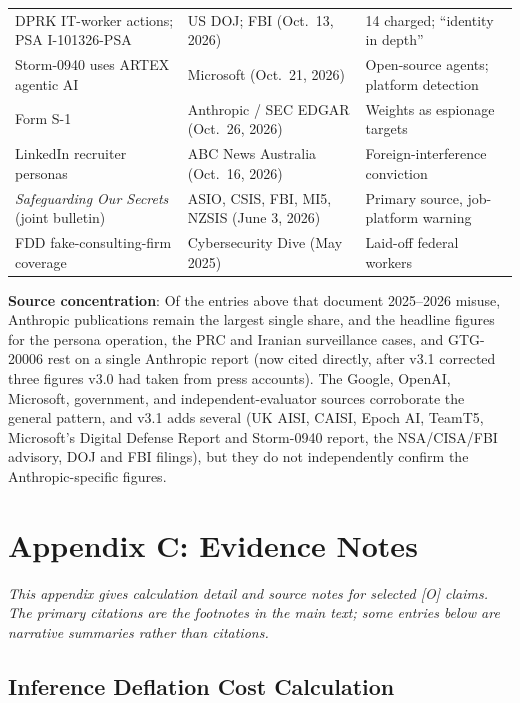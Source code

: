 \documentclass[11pt,letterpaper]{article}
\begin{document}
{\begin{longtable}{L{6.4cm}L{4.4cm}L{5.2cm}}
DPRK IT-worker actions; PSA I-101326-PSA & US DOJ; FBI (Oct.\ 13, 2026) & 14 charged; ``identity in depth'' \\
Storm-0940 uses ARTEX agentic AI & Microsoft (Oct.\ 21, 2026) & Open-source agents; platform detection \\
Form S-1 & Anthropic / SEC EDGAR (Oct.\ 26, 2026) & Weights as espionage targets \\
LinkedIn recruiter personas & ABC News Australia (Oct.\ 16, 2026) & Foreign-interference conviction \\
\textit{Safeguarding Our Secrets} (joint bulletin) & ASIO, CSIS, FBI, MI5, NZSIS (June 3, 2026) & Primary source, job-platform warning \\
FDD fake-consulting-firm coverage & Cybersecurity Dive (May 2025) & Laid-off federal workers \\
\bottomrule
\end{longtable}}

\textbf{Source concentration}: Of the entries above that document 2025--2026 misuse, Anthropic publications remain the largest single share, and the headline figures for the persona operation, the PRC and Iranian surveillance cases, and GTG-20006 rest on a single Anthropic report (now cited directly, after v3.1 corrected three figures v3.0 had taken from press accounts). The Google, OpenAI, Microsoft, government, and independent-evaluator sources corroborate the general pattern, and v3.1 adds several (UK AISI, CAISI, Epoch AI, TeamT5, Microsoft's Digital Defense Report and Storm-0940 report, the NSA/CISA/FBI advisory, DOJ and FBI filings), but they do not independently confirm the Anthropic-specific figures.

\section*{Appendix C: Evidence Notes}

\textit{This appendix gives calculation detail and source notes for selected [O] claims. The primary citations are the footnotes in the main text; some entries below are narrative summaries rather than citations.}

\subsection*{Inference Deflation Cost Calculation}
\end{document}
